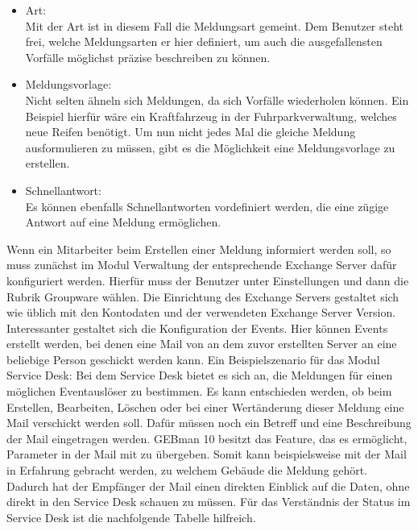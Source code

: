 \begin{itemize}[itemsep=10pt]
\item Art:\\
		Mit der Art ist in diesem Fall die Meldungsart gemeint. Dem Benutzer steht frei, welche 
		Meldungsarten er hier definiert, um auch die ausgefallensten Vorfälle möglichst präzise beschreiben zu 
		können.  \\
		 
\item Meldungsvorlage:\\
		Nicht selten ähneln sich Meldungen, da sich Vorfälle wiederholen können. Ein Beispiel hierfür wäre ein 
		Kraftfahrzeug in der Fuhrparkverwaltung, welches neue Reifen benötigt. Um nun nicht jedes Mal die 
		gleiche Meldung ausformulieren zu müssen, gibt es die Möglichkeit eine Meldungsvorlage zu erstellen. 
		
\item Schnellantwort:\\
		Es können ebenfalls Schnellantworten vordefiniert werden, die eine zügige Antwort auf eine Meldung 
		ermöglichen.\\		
\end{itemize}

\noindent
Wenn ein Mitarbeiter beim Erstellen einer Meldung informiert werden soll, so muss zunächst im Modul Verwaltung der entsprechende Exchange Server dafür konfiguriert werden. Hierfür muss der Benutzer unter Einstellungen und dann die Rubrik Groupware wählen. Die Einrichtung des Exchange Servers gestaltet sich wie üblich mit den Kontodaten und der verwendeten Exchange Server Version.\newline
Interessanter gestaltet sich die Konfiguration der Events. Hier können Events erstellt werden, bei denen eine Mail von an dem zuvor erstellten Server an eine beliebige Person geschickt werden kann. Ein Beispielszenario für das Modul Service Desk:\newline
Bei dem Service Desk bietet es sich an, die Meldungen für einen möglichen Eventauslöser zu bestimmen. Es kann entschieden werden, ob beim Erstellen, Bearbeiten, Löschen oder bei einer Wertänderung dieser Meldung eine Mail verschickt werden soll. Dafür müssen noch ein Betreff und eine Beschreibung der Mail eingetragen werden. GEBman 10 besitzt das Feature, das es ermöglicht, Parameter in der Mail mit zu übergeben. Somit kann beispielsweise mit der Mail in Erfahrung gebracht werden, zu welchem Gebäude die Meldung gehört. Dadurch hat der Empfänger der Mail einen direkten Einblick auf die Daten, ohne direkt in den Service Desk schauen zu müssen. Für das Verständnis der Status im Service Desk ist die nachfolgende Tabelle hilfreich.\\

